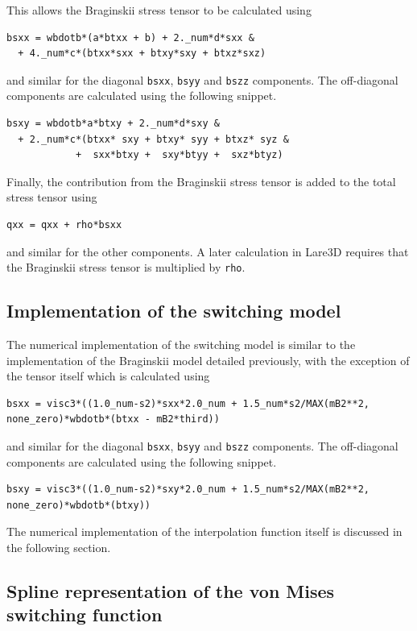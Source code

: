 This allows the Braginskii stress tensor to be calculated using
\begin{verbatim}
bsxx = wbdotb*(a*btxx + b) + 2._num*d*sxx &
  + 4._num*c*(btxx*sxx + btxy*sxy + btxz*sxz)
\end{verbatim}
and similar for the diagonal \verb|bsxx|, \verb|bsyy| and \verb|bszz| components. The off-diagonal components are calculated using the following snippet.
\begin{verbatim}
bsxy = wbdotb*a*btxy + 2._num*d*sxy &
  + 2._num*c*(btxx* sxy + btxy* syy + btxz* syz &
            +  sxx*btxy +  sxy*btyy +  sxz*btyz)
\end{verbatim}

Finally, the contribution from the Braginskii stress tensor is added to the total stress tensor using 
\begin{verbatim}
qxx = qxx + rho*bsxx
\end{verbatim}
and similar for the other components. A later calculation in Lare3D requires that the Braginskii stress tensor is multiplied by \verb|rho|.

\subsection{Implementation of the switching model}

The numerical implementation of the switching model is similar to the implementation of the Braginskii model detailed previously, with the exception of the tensor itself which is calculated using
\begin{verbatim}
bsxx = visc3*((1.0_num-s2)*sxx*2.0_num + 1.5_num*s2/MAX(mB2**2, none_zero)*wbdotb*(btxx - mB2*third))
\end{verbatim}
and similar for the diagonal \verb|bsxx|, \verb|bsyy| and \verb|bszz| components. The off-diagonal components are calculated using the following snippet.
\begin{verbatim}
bsxy = visc3*((1.0_num-s2)*sxy*2.0_num + 1.5_num*s2/MAX(mB2**2, none_zero)*wbdotb*(btxy))
\end{verbatim}

The numerical implementation of the interpolation function itself is discussed in the following section.

\subsection{Spline representation of the von Mises switching function}

